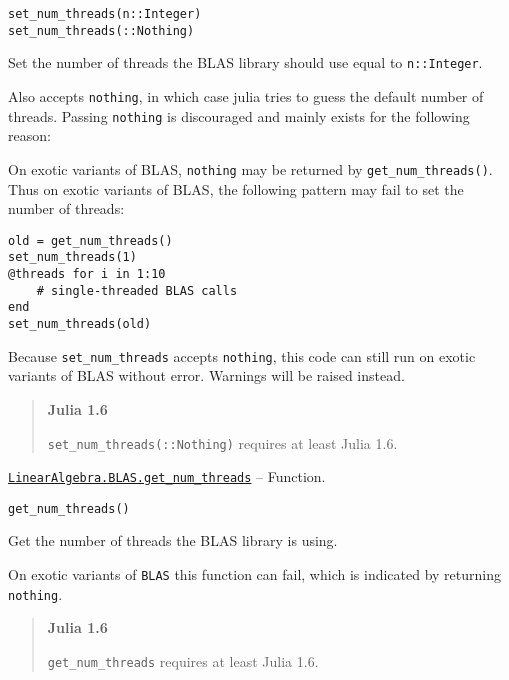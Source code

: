 \begin{adjustwidth}{2em}{0pt}


\begin{verbatim}
set_num_threads(n::Integer)
set_num_threads(::Nothing)
\end{verbatim}

Set the number of threads the BLAS library should use equal to \texttt{n::Integer}.

Also accepts \texttt{nothing}, in which case julia tries to guess the default number of threads. Passing \texttt{nothing} is discouraged and mainly exists for the following reason:

On exotic variants of BLAS, \texttt{nothing} may be returned by \texttt{get\_num\_threads()}. Thus on exotic variants of BLAS, the following pattern may fail to set the number of threads:


\begin{verbatim}
old = get_num_threads()
set_num_threads(1)
@threads for i in 1:10
    # single-threaded BLAS calls
end
set_num_threads(old)
\end{verbatim}

Because \texttt{set\_num\_threads} accepts \texttt{nothing}, this code can still run on exotic variants of BLAS without error. Warnings will be raised instead.

\begin{quote}
\textbf{Julia 1.6}

\texttt{set\_num\_threads(::Nothing)} requires at least Julia 1.6.

\end{quote}


\end{adjustwidth}
\hypertarget{11499470670265928682}{}
\hyperlink{11499470670265928682}{\texttt{LinearAlgebra.BLAS.get\_num\_threads}}  -- {Function.}

\begin{adjustwidth}{2em}{0pt}


\begin{verbatim}
get_num_threads()
\end{verbatim}

Get the number of threads the BLAS library is using.

On exotic variants of \texttt{BLAS} this function can fail, which is indicated by returning \texttt{nothing}.

\begin{quote}
\textbf{Julia 1.6}

\texttt{get\_num\_threads} requires at least Julia 1.6.

\end{quote}


\end{adjustwidth}

